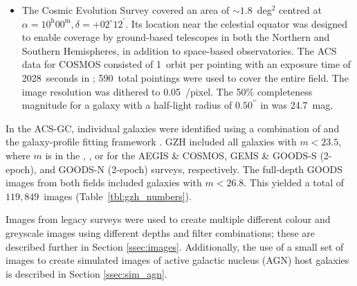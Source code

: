\documentclass[a4paper,fleqn,usenatbib]{mnras}
\begin{document}
\begin{itemize}
\item The Cosmic Evolution Survey \citep[COSMOS;][]{sco07,koe07} covered an area of
    $\sim1.8$~deg$^2$ centred at $\alpha=10^\textrm{h}00^\textrm{m},
    \delta=+02^\circ12^\prime$. Its location near the celestial equator was
    designed to enable coverage by ground-based telescopes in both the Northern and
    Southern Hemispheres, in addition to space-based observatories. The ACS data
    for COSMOS consisted of 1~orbit per pointing with an exposure time of
    2028~seconds in \Iband; 590~total pointings were used to cover the entire
    field. The image resolution was dithered to 0.05~\arcsec/pixel. The 50\%
    completeness magnitude for a galaxy with a half-light radius of
    $0.50^{\prime\prime}$ in \Iband{} was 24.7~mag. 

\end{itemize}

In the ACS-GC, individual galaxies were identified using a
combination of \sextractor{} \citep{ber96} and the galaxy-profile fitting
framework \galapagos{} \citep{bar12}. GZH included all galaxies with $m<23.5$,
where $m$ is in the \Iband, \zband, or \iband{} for the AEGIS \& COSMOS, GEMS \&
GOODS-S (2-epoch), and GOODS-N (2-epoch) surveys, respectively. The full-depth
GOODS images from both fields included galaxies with $m<26.8$. This yielded a
total of $119,849$~images (Table~\ref{tbl:gzh_numbers}).

Images from \hst{} legacy surveys were used to create multiple different colour
and greyscale images using different depths and filter combinations; these are
described further in Section \ref{ssec:images}. Additionally, the use of a
small set of \hst{} images to create simulated images of active galactic
nucleus (AGN) host galaxies is described in Section \ref{ssec:sim_agn}.


\end{document}
